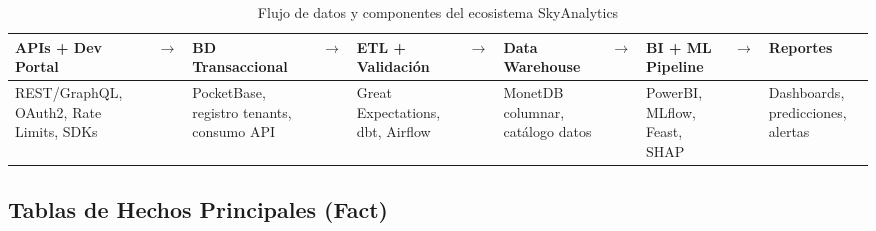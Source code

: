 ﻿\documentclass[11pt, letterpaper]{article}
\begin{document}
\begin{table}[H]

\small

\centering

\begin{tabularx}{\linewidth}{>{\centering\arraybackslash}p{2.0cm} c >{\centering\arraybackslash}p{2.0cm} c >{\centering\arraybackslash}p{1.8cm} c >{\centering\arraybackslash}p{1.8cm} c >{\centering\arraybackslash}p{1.8cm} c >{\centering\arraybackslash}p{1.8cm}}

\toprule

\textbf{APIs + Dev Portal} & $\rightarrow$ & \textbf{BD Transaccional} & $\rightarrow$ & \textbf{ETL + Validación} & $\rightarrow$ & \textbf{Data Warehouse} & $\rightarrow$ & \textbf{BI + ML Pipeline} & $\rightarrow$ & \textbf{Reportes} \\

\midrule

REST/GraphQL, OAuth2, Rate Limits, SDKs & & PocketBase, registro tenants, consumo API & & Great Expectations, dbt, Airflow & & MonetDB columnar, catálogo datos & & PowerBI, MLflow, Feast, SHAP & & Dashboards, predicciones, alertas \\

\bottomrule

\end{tabularx}

\caption{Flujo de datos y componentes del ecosistema SkyAnalytics}

\end{table}




\subsection{Tablas de Hechos Principales (Fact)}
\end{document}
